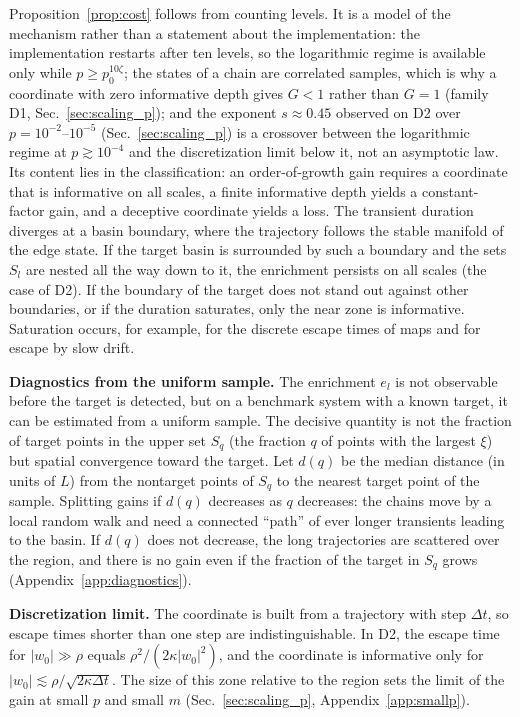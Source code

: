 Proposition~\ref{prop:cost} follows from counting levels. It is a model of the mechanism rather than a statement about the implementation: the implementation restarts after ten levels, so the logarithmic regime is available only while $p\ge p_0^{10\zeta}$; the states of a chain are correlated samples, which is why a coordinate with zero informative depth gives $G<1$ rather than $G=1$ (family D1, Sec.~\ref{sec:scaling_p}); and the exponent $s\approx0.45$ observed on D2 over $p=10^{-2}$--$10^{-5}$ (Sec.~\ref{sec:scaling_p}) is a crossover between the logarithmic regime at $p\gtrsim10^{-4}$ and the discretization limit below it, not an asymptotic law. Its content lies in the classification: an order-of-growth gain requires a coordinate that is informative on all scales, a finite informative depth yields a constant-factor gain, and a deceptive coordinate yields a loss. The transient duration diverges at a basin boundary, where the trajectory follows the stable manifold of the edge state. If the target basin is surrounded by such a boundary and the sets $S_l$ are nested all the way down to it, the enrichment persists on all scales (the case of D2). If the boundary of the target does not stand out against other boundaries, or if the duration saturates, only the near zone is informative. Saturation occurs, for example, for the discrete escape times of maps and for escape by slow drift.

\textbf{Diagnostics from the uniform sample.} The enrichment $e_l$ is not observable before the target is detected, but on a benchmark system with a known target, it can be estimated from a uniform sample. The decisive quantity is not the fraction of target points in the upper set $S_q$ (the fraction $q$ of points with the largest $\xi$) but spatial convergence toward the target. Let $d(q)$ be the median distance (in units of $L$) from the nontarget points of $S_q$ to the nearest target point of the sample. Splitting gains if $d(q)$ decreases as $q$ decreases: the chains move by a local random walk and need a connected ``path'' of ever longer transients leading to the basin. If $d(q)$ does not decrease, the long trajectories are scattered over the region, and there is no gain even if the fraction of the target in $S_q$ grows (Appendix~\ref{app:diagnostics}).

\textbf{Discretization limit.} The coordinate is built from a trajectory with step $\Delta t$, so escape times shorter than one step are indistinguishable. In D2, the escape time for $|w_0|\gg\rho$ equals $\rho^2/(2\kappa|w_0|^2)$, and the coordinate is informative only for $|w_0|\lesssim\rho/\sqrt{2\kappa\Delta t}$. The size of this zone relative to the region sets the limit of the gain at small $p$ and small $m$ (Sec.~\ref{sec:scaling_p}, Appendix~\ref{app:smallp}).

